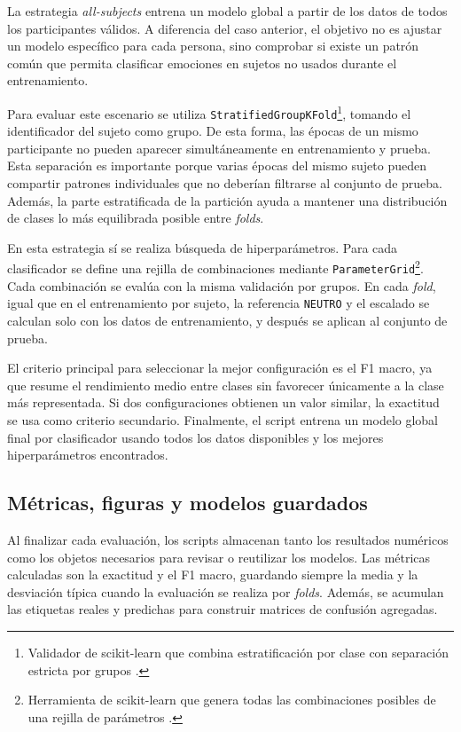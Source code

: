 La estrategia \textit{all-subjects} entrena un modelo global a partir de los datos de todos los participantes válidos. A diferencia del caso anterior, el objetivo no es ajustar un modelo específico para cada persona, sino comprobar si existe un patrón común que permita clasificar emociones en sujetos no usados durante el entrenamiento.

Para evaluar este escenario se utiliza \texttt{StratifiedGroupKFold}\footnote{Validador de scikit-learn que combina estratificación por clase con separación estricta por grupos \cite{sklearnStratifiedGroupKFoldDocs}.}, tomando el identificador del sujeto como grupo. De esta forma, las épocas de un mismo participante no pueden aparecer simultáneamente en entrenamiento y prueba. Esta separación es importante porque varias épocas del mismo sujeto pueden compartir patrones individuales que no deberían filtrarse al conjunto de prueba. Además, la parte estratificada de la partición ayuda a mantener una distribución de clases lo más equilibrada posible entre \textit{folds}.

En esta estrategia sí se realiza búsqueda de hiperparámetros. Para cada clasificador se define una rejilla de combinaciones mediante \texttt{ParameterGrid}\footnote{Herramienta de scikit-learn que genera todas las combinaciones posibles de una rejilla de parámetros \cite{sklearnParameterGridDocs}.}. Cada combinación se evalúa con la misma validación por grupos. En cada \textit{fold}, igual que en el entrenamiento por sujeto, la referencia \texttt{NEUTRO} y el escalado se calculan solo con los datos de entrenamiento, y después se aplican al conjunto de prueba.

El criterio principal para seleccionar la mejor configuración es el F1 macro, ya que resume el rendimiento medio entre clases sin favorecer únicamente a la clase más representada. Si dos configuraciones obtienen un valor similar, la exactitud se usa como criterio secundario. Finalmente, el script entrena un modelo global final por clasificador usando todos los datos disponibles y los mejores hiperparámetros encontrados.

\subsection{Métricas, figuras y modelos guardados}

Al finalizar cada evaluación, los scripts almacenan tanto los resultados numéricos como los objetos necesarios para revisar o reutilizar los modelos. Las métricas calculadas son la exactitud y el F1 macro, guardando siempre la media y la desviación típica cuando la evaluación se realiza por \textit{folds}. Además, se acumulan las etiquetas reales y predichas para construir matrices de confusión agregadas.


